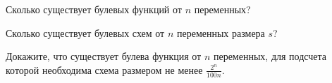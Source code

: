 \begin{enumcyr}
	\item Сколько существует булевых функций от $n$ переменных?
    \item Сколько существует булевых схем от $n$ переменных размера $s$?
    \item Докажите, что существует булева функция от $n$ переменных, для подсчета которой необходима
	    схема размером не менее $\frac{2^n}{100n}$.
\end{enumcyr}